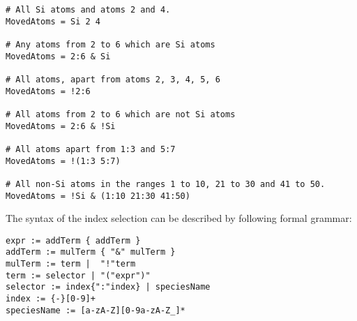 \begin{itemize}
\begin{verbatim}
# All Si atoms and atoms 2 and 4.
MovedAtoms = Si 2 4

# Any atoms from 2 to 6 which are Si atoms
MovedAtoms = 2:6 & Si

# All atoms, apart from atoms 2, 3, 4, 5, 6
MovedAtoms = !2:6

# All atoms from 2 to 6 which are not Si atoms
MovedAtoms = 2:6 & !Si

# All atoms apart from 1:3 and 5:7
MovedAtoms = !(1:3 5:7)

# All non-Si atoms in the ranges 1 to 10, 21 to 30 and 41 to 50.
MovedAtoms = !Si & (1:10 21:30 41:50)
\end{verbatim}

The syntax of the index selection can be described by following formal grammar:

\begin{verbatim}
expr := addTerm { addTerm }
addTerm := mulTerm { "&" mulTerm }
mulTerm := term |  "!"term
term := selector | "("expr")"
selector := index{":"index} | speciesName
index := {-}[0-9]+
speciesName := [a-zA-Z][0-9a-zA-Z_]*
\end{verbatim}

\end{itemize}
